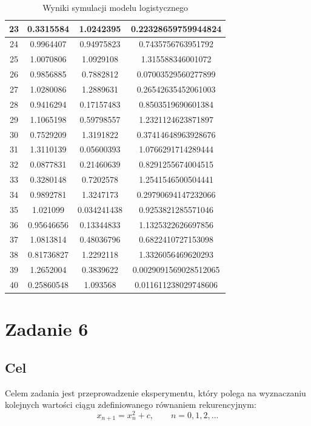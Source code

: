 \documentclass{article}
\begin{document}
\begin{table}[h!]
\begin{tabular}{ |c|c|c|c| }
    \hline
    23 & 0.3315584 & 1.0242395 & 0.22328659759944824 \\
    \hline
    24 & 0.9964407 & 0.94975823 & 0.7435756763951792 \\
    \hline
    25 & 1.0070806 & 1.0929108 & 1.315588346001072 \\
    \hline
    26 & 0.9856885 & 0.7882812 & 0.07003529560277899 \\
    \hline
    27 & 1.0280086 & 1.2889631 & 0.26542635452061003 \\
    \hline
    28 & 0.9416294 & 0.17157483 & 0.8503519690601384 \\
    \hline
    29 & 1.1065198 & 0.59798557 & 1.2321124623871897 \\
    \hline
    30 & 0.7529209 & 1.3191822 & 0.37414648963928676 \\
    \hline
    31 & 1.3110139 & 0.05600393 & 1.0766291714289444 \\
    \hline
    32 & 0.0877831 & 0.21460639 & 0.8291255674004515 \\
    \hline
    33 & 0.3280148 & 0.7202578 & 1.2541546500504441 \\
    \hline
    34 & 0.9892781 & 1.3247173 & 0.29790694147232066 \\
    \hline
    35 & 1.021099 & 0.034241438 & 0.9253821285571046 \\
    \hline
    36 & 0.95646656 & 0.13344833 & 1.1325322626697856 \\
    \hline
    37 & 1.0813814 & 0.48036796 & 0.6822410727153098 \\
    \hline
    38 & 0.81736827 & 1.2292118 & 1.3326056469620293 \\
    \hline
    39 & 1.2652004 & 0.3839622 & 0.0029091569028512065 \\
    \hline
    40 & 0.25860548 & 1.093568 & 0.011611238029748606 \\
    \hline
    \end{tabular}
    \caption{Wyniki symulacji modelu logistycznego}
\end{table}

\newpage

\section{Zadanie 6}
\subsection{Cel}
Celem zadania jest przeprowadzenie eksperymentu, który polega na wyznaczaniu kolejnych wartości ciągu zdefiniowanego równaniem rekurencyjnym:
$$x_{n+1} = x_n^2 + c, \qquad n = 0, 1, 2, ...$$ 
\end{document}
